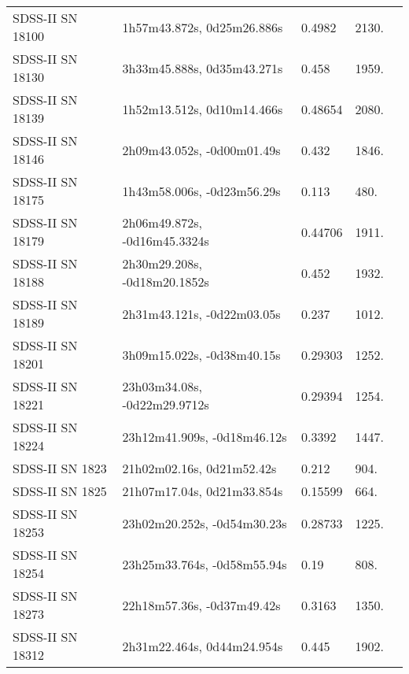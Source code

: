 \begin{longtable}{lllll}
 SDSS-II SN 18100 &     1h57m43.872s, 0d25m26.886s &   0.4982 &          2130. &    \citet{2011ApJ...738..162S} \\
 SDSS-II SN 18130 &     3h33m45.888s, 0d35m43.271s &    0.458 &          1959. &    \citet{2011ApJ...738..162S} \\
 SDSS-II SN 18139 &     1h52m13.512s, 0d10m14.466s &  0.48654 &          2080. &    \citet{2016SDSSD.C...0000:} \\
 SDSS-II SN 18146 &     2h09m43.052s, -0d00m01.49s &    0.432 &          1846. &    \citet{2010ApJ...713.1026D} \\
 SDSS-II SN 18175 &     1h43m58.006s, -0d23m56.29s &    0.113 &           480. &    \citet{2011ApJ...738..162S} \\
 SDSS-II SN 18179 &   2h06m49.872s, -0d16m45.3324s &  0.44706 &          1911. &    \citet{2016SDSSD.C...0000:} \\
 SDSS-II SN 18188 &   2h30m29.208s, -0d18m20.1852s &    0.452 &          1932. &    \citet{2011ApJ...738..162S} \\
 SDSS-II SN 18189 &     2h31m43.121s, -0d22m03.05s &    0.237 &          1012. &    \citet{2011ApJ...738..162S} \\
 SDSS-II SN 18201 &     3h09m15.022s, -0d38m40.15s &  0.29303 &          1252. &    \citet{2016SDSSD.C...0000:} \\
 SDSS-II SN 18221 &   23h03m34.08s, -0d22m29.9712s &  0.29394 &          1254. &    \citet{2016SDSSD.C...0000:} \\
 SDSS-II SN 18224 &    23h12m41.909s, -0d18m46.12s &   0.3392 &          1447. &    \citet{2011ApJ...738..162S} \\
  SDSS-II SN 1823 &      21h02m02.16s, 0d21m52.42s &    0.212 &           904. &    \citet{2011ApJ...738..162S} \\
  SDSS-II SN 1825 &     21h07m17.04s, 0d21m33.854s &  0.15599 &           664. &    \citet{2004SDSS2.C...0000:} \\
 SDSS-II SN 18253 &    23h02m20.252s, -0d54m30.23s &  0.28733 &          1225. &    \citet{2016SDSSD.C...0000:} \\
 SDSS-II SN 18254 &    23h25m33.764s, -0d58m55.94s &     0.19 &           808. &    \citet{2011ApJ...738..162S} \\
 SDSS-II SN 18273 &     22h18m57.36s, -0d37m49.42s &   0.3163 &          1350. &    \citet{2011ApJ...738..162S} \\
 SDSS-II SN 18312 &     2h31m22.464s, 0d44m24.954s &    0.445 &          1902. &    \citet{2011ApJ...738..162S} \\

\end{longtable}
